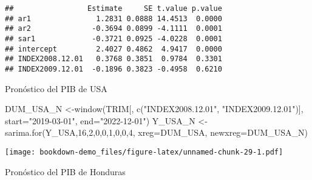 \documentclass[
]{book}
\newenvironment{Shaded}{\begin{snugshade}}{\end{snugshade}}
\newcommand{\AttributeTok}[1]{\textcolor[rgb]{0.77,0.63,0.00}{#1}}
\newcommand{\DecValTok}[1]{\textcolor[rgb]{0.00,0.00,0.81}{#1}}
\newcommand{\FunctionTok}[1]{\textcolor[rgb]{0.00,0.00,0.00}{#1}}
\newcommand{\NormalTok}[1]{#1}
\newcommand{\OtherTok}[1]{\textcolor[rgb]{0.56,0.35,0.01}{#1}}
\newcommand{\StringTok}[1]{\textcolor[rgb]{0.31,0.60,0.02}{#1}}
\begin{document}
\begin{verbatim}
##                 Estimate     SE t.value p.value
## ar1               1.2831 0.0888 14.4513  0.0000
## ar2              -0.3694 0.0899 -4.1111  0.0001
## sar1             -0.3721 0.0925 -4.0228  0.0001
## intercept         2.4027 0.4862  4.9417  0.0000
## INDEX2008.12.01   0.3768 0.3851  0.9784  0.3301
## INDEX2009.12.01  -0.1896 0.3823 -0.4958  0.6210
\end{verbatim}

Pronóstico del PIB de USA

\begin{Shaded}
\begin{Highlighting}[]
\NormalTok{DUM\_USA\_N }\OtherTok{\textless{}{-}}\FunctionTok{window}\NormalTok{(TRIM[, }\FunctionTok{c}\NormalTok{(}\StringTok{"INDEX2008.12.01"}\NormalTok{, }\StringTok{"INDEX2009.12.01"}\NormalTok{)], }\AttributeTok{start=}\StringTok{"2019{-}03{-}01"}\NormalTok{, }\AttributeTok{end=}\StringTok{"2022{-}12{-}01"}\NormalTok{)}
\NormalTok{Y\_USA\_N   }\OtherTok{\textless{}{-}}\FunctionTok{sarima.for}\NormalTok{(Y\_USA,}\DecValTok{16}\NormalTok{,}\DecValTok{2}\NormalTok{,}\DecValTok{0}\NormalTok{,}\DecValTok{0}\NormalTok{,}\DecValTok{1}\NormalTok{,}\DecValTok{0}\NormalTok{,}\DecValTok{0}\NormalTok{,}\DecValTok{4}\NormalTok{, }\AttributeTok{xreg=}\NormalTok{DUM\_USA, }\AttributeTok{newxreg=}\NormalTok{DUM\_USA\_N) }
\end{Highlighting}
\end{Shaded}

\texttt{[image: bookdown-demo\_files/figure-latex/unnamed-chunk-29-1.pdf]}

Pronóstico del PIB de Honduras
\end{document}
